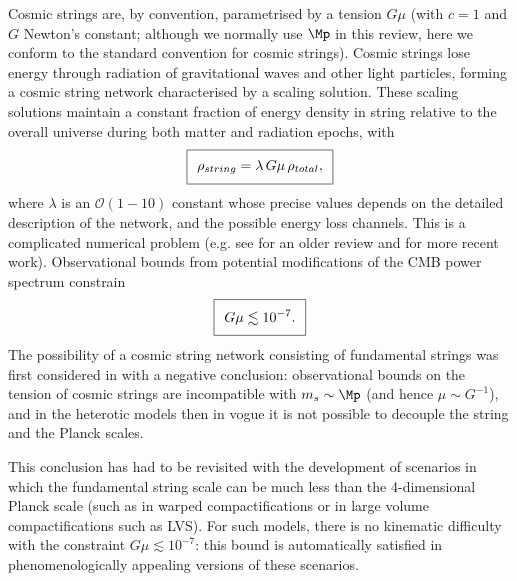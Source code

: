 Cosmic strings are, by convention, parametrised by a tension $G \mu$ (with $c=1$ and $G$ Newton's constant; although we normally use $\Mp$ in this review, here we conform to the standard convention for cosmic strings). 
Cosmic strings lose energy through radiation of gravitational waves and other light particles, forming a cosmic string network characterised by a scaling solution. These scaling solutions maintain a constant fraction of energy density in string relative to the overall universe during both matter and radiation epochs, with
\begin{equation}
\setlength\fboxsep{0.25cm}
\setlength\fboxrule{0.4pt}
\boxed{
\rho_{string} = \lambda \, G \mu \, \rho_{total},
}
\end{equation}
where $\lambda$ is an $\mathcal{O}(1 - 10)$ constant whose precise values depends on 
the detailed description of the network, and the possible energy loss channels. This is a complicated numerical problem (e.g. see \cite{Hindmarsh:1994re} for an older review and \cite{Gorghetto:2018myk} for more recent work). Observational bounds from potential modifications of the CMB power spectrum constrain
\begin{equation}
\setlength\fboxsep{0.25cm}
\setlength\fboxrule{0.4pt}
\boxed{
G \mu \lesssim 10^{-7}.
}
\end{equation}
The possibility of a cosmic string network consisting of fundamental strings was first considered in \cite{Witten:1984eb} with a negative conclusion: observational bounds on the tension of cosmic strings are incompatible with $ m_s \sim \Mp$ (and hence $\mu \sim G^{-1}$), and in the heterotic models then in vogue it is not possible to decouple the string and the Planck scales.

This conclusion has had to be revisited with the development of scenarios in which the fundamental string scale can be much less than the 4-dimensional Planck scale (such as in warped compactifications or in large volume compactifications such as LVS). For such models, there is no kinematic difficulty with the constraint $G \mu \lesssim 10^{-7}$: this bound is automatically satisfied in phenomenologically appealing versions of these scenarios.

